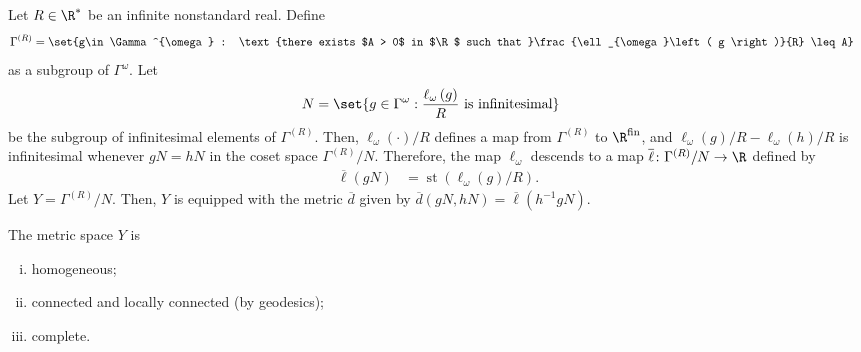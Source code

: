\documentclass[10pt]{mypackage}
\begin{document}
Let $R\in \R^{\ast}$ be an infinite nonstandard real. Define
\begin{align*}
  \Gamma^{(R)} &= \set{g\in \Gamma^{\omega} : \text{there exists $A > 0$ in $\R$ such that }\frac{\ell_{\omega}\left( g \right)}{R} \leq A}
\end{align*}
as a subgroup of $\Gamma^{\omega}$. Let
\begin{align*}
  N &= \set{g\in \Gamma^{\omega} : \frac{\ell_{\omega}\left( g \right)}{R}\text{ is infinitesimal}}
\end{align*}
be the subgroup of infinitesimal elements of $\Gamma^{(R)}$. Then, $\ell_{\omega}\left( \cdot \right)/R$ defines a map from $\Gamma^{(R)}$ to $\R^{\operatorname{fin}}$, and $\ell_{\omega}\left( g \right)/R-\ell_{\omega}\left( h \right)/R$ is infinitesimal whenever $gN = hN$ in the coset space $\Gamma^{(R)}/N$. Therefore, the map $\ell_{\omega}$ descends to a map $ \overline{\ell}\colon \Gamma^{(R)}/N\to \R $ defined by
\begin{align*}
  \overline{\ell}\left( gN \right) &= \operatorname{st}\left( \ell_{\omega}\left( g \right)/R \right).
\end{align*}
Let $Y = \Gamma^{(R)}/N$. Then, $Y$ is equipped with the metric $ \overline{d} $ given by $ \overline{d}\left( gN,hN \right) = \overline{\ell}\left( h^{-1}gN \right) $.
\begin{proposition}
  The metric space $Y$ is
  \begin{enumerate}[(i)]
    \item homogeneous;
    \item connected and locally connected (by geodesics);
    \item complete.
  \end{enumerate}
\end{proposition}
\end{document}
